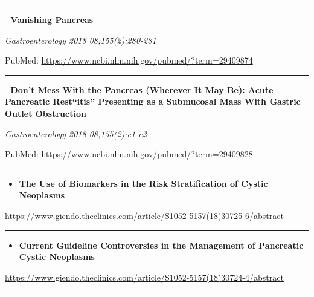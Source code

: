 \documentclass[]{article}
\providecommand{\tightlist}{%
  \setlength{\itemsep}{0pt}\setlength{\parskip}{0pt}}
\begin{document}
{}

\begin{center}\rule{0.5\linewidth}{\linethickness}\end{center}

 - \textbf{Vanishing Pancreas}

\emph{Gastroenterology 2018 08;155(2):280-281}

PubMed: \url{https://www.ncbi.nlm.nih.gov/pubmed/?term=29409874}

{}

{}

\begin{center}\rule{0.5\linewidth}{\linethickness}\end{center}

 - \textbf{Don't Mess With the Pancreas (Wherever It May Be): Acute
Pancreatic Rest``itis'' Presenting as a Submucosal Mass With Gastric
Outlet Obstruction}

\emph{Gastroenterology 2018 08;155(2):e1-e2}

PubMed: \url{https://www.ncbi.nlm.nih.gov/pubmed/?term=29409828}

{}

{}

\begin{center}\rule{0.5\linewidth}{\linethickness}\end{center}

\begin{itemize}
\tightlist
\item
  \textbf{The Use of Biomarkers in the Risk Stratification of Cystic
  Neoplasms}
\end{itemize}

\url{https://www.giendo.theclinics.com/article/S1052-5157(18)30725-6/abstract}

\begin{center}\rule{0.5\linewidth}{\linethickness}\end{center}

\begin{itemize}
\tightlist
\item
  \textbf{Current Guideline Controversies in the Management of
  Pancreatic Cystic Neoplasms}
\end{itemize}

\url{https://www.giendo.theclinics.com/article/S1052-5157(18)30724-4/abstract}

\begin{center}\rule{0.5\linewidth}{\linethickness}\end{center}
\end{document}
